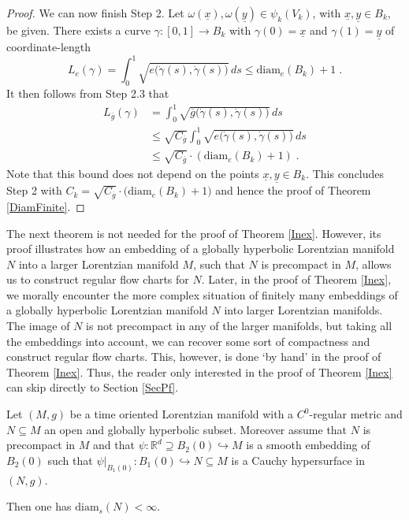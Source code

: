 \documentclass[reqno]{article}
\newcommand{\R}{\mathbb{R}}
\newcommand{\diam}{\mathrm{diam}}
\newcommand{\ux}{\underline{x}}
\begin{document}
\begin{proof}
We can now finish Step 2. Let $\omega(\ux), \omega(\underline{y}) \in \psi_k(V_k)$, with $\ux, \underline{y} \in B_k$, be given. There exists a curve $\gamma : [0,1] \to B_k$ with $\gamma(0) = \ux$ and $\gamma(1) = \underline{y}$ of coordinate-length 
\begin{equation*}
L_e(\gamma) = \int_0^1 \sqrt{e\big(\dot{\gamma}(s), \dot{\gamma}(s)\big)} \, ds \leq \diam_e(B_k) + 1 \;.
\end{equation*}
It then follows from Step 2.3 that 
\begin{equation*}
\begin{split}
L_{\overline{g}}(\gamma) &= \int_0^1 \sqrt{\overline{g}\big( \dot{\gamma}(s), \dot{\gamma}(s)\big)} \, ds \\
&\leq \sqrt{C_{\overline{g}}} \int_0^1 \sqrt{e\big( \dot{\gamma}(s), \dot{\gamma}(s)\big)} \, ds \\
&\leq \sqrt{C_{\overline{g}}} \cdot (\diam_e(B_k) + 1) \;.
\end{split}
\end{equation*}
Note that this bound does not depend on the points $\ux, \underline{y} \in B_k$. 
This concludes Step 2 with $C_k = \sqrt{C_{\overline{g}}} \cdot \big(\diam_e(B_k) + 1\big)$ and hence the proof of Theorem \ref{DiamFinite}.
\end{proof}

The next theorem is not needed for the proof of Theorem \ref{Inex}. However, its proof illustrates how an embedding of a globally hyperbolic Lorentzian manifold $N$ into a larger Lorentzian manifold $M$, such that $N$ is precompact in $M$, allows us to construct regular flow charts for $N$. Later, in the proof of Theorem \ref{Inex}, we morally encounter the more complex situation of finitely many embeddings of a globally hyperbolic Lorentzian manifold $N$ into larger Lorentzian manifolds. The image of $N$ is not precompact in any of the larger manifolds, but taking all the embeddings into account, we can recover some sort of compactness and construct regular flow charts. This, however, is done `by hand' in the proof of Theorem \ref{Inex}. Thus, the reader only interested in the proof of Theorem \ref{Inex} can skip directly to Section \ref{SecPf}.



\begin{theorem}\label{schwthm:time_oriented_lorentzian_manifold}
Let $(M,g)$ be a time oriented Lorentzian manifold with a $C^0$-regular metric and $N \subseteq M$ an open and globally hyperbolic subset. Moreover assume that $N$ is precompact in $M$ and that $\psi : \R^d \supseteq B_2(0) \hookrightarrow M$ is a smooth embedding of $B_2(0)$ such that $\psi|_{B_1(0)} : B_1(0) \hookrightarrow N \subseteq M$ is a Cauchy hypersurface in $(N,g)$.

Then one has $\diam_s(N) < \infty$.
\end{theorem}
\end{document}
